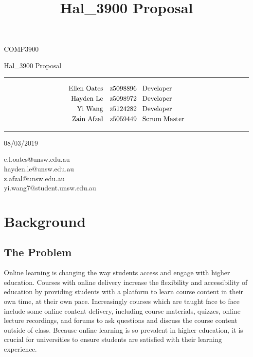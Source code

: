 \documentclass{article}
\title{Hal\_3900 Proposal}
\begin{document}
\begin{LARGE}
\begin{center}
\vspace*{15mm}

COMP3900

Hal\_3900 Proposal

\rule[4.5pt]{0.61\textwidth}{0.3pt}

\begin{align*}
  \text{Ellen Oates}  \quad &\text{z5098896 \enspace Developer} \\
  \text{Hayden Le}    \quad &\text{z5098972 \enspace Developer} \\
  \text{Yi Wang}      \quad &\text{z5124282 \enspace Developer} \\
  \text{Zain Afzal}   \quad &\text{z5059449 \enspace Scrum Master}
\end{align*}

\rule[4.5pt]{0.61\textwidth}{0.3pt}

08/03/2019

\end{center}
\end{LARGE}

\vfill
\small{e.l.oates@unsw.edu.au}\\
\small{hayden.le@unsw.edu.au}\\
\small{z.afzal@unsw.edu.au}\\
\small{yi.wang7@student.unsw.edu.au}

\newpage


\tableofcontents 
\newpage
 
\section{Background}

\subsection{The Problem}
Online learning is changing the way students access and engage with higher education. Courses with online delivery increase the flexibility and accessibility of education by providing students with a platform to learn course content in their own time, at their own pace. Increasingly courses which are taught face to face include some online content delivery, including course materials, quizzes, online lecture recordings, and forums to ask questions and discuss the course content outside of class. Because online learning is so prevalent in higher education, it is crucial for universities to ensure students are satisfied with their learning experience. 
\end{document}
